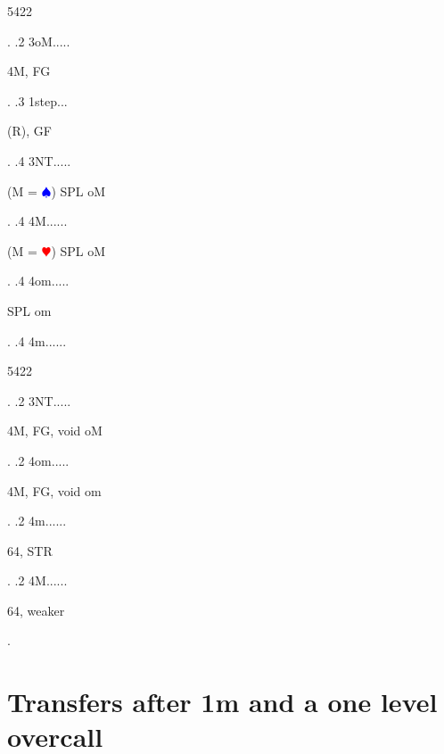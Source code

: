 \documentclass[a4paper]{article}
\newcommand{\BH}{\textcolor{Red}{$\varheartsuit${}}}
\newcommand{\BS}{\textcolor{Blue}{$\spadesuit${}}}
\begin{document}
{\begin{minipage}[t]{0.8\textwidth}
5422
\end{minipage}. 
 .2 3oM.....\begin{minipage}[t]{0.8\textwidth}
4M, FG
\end{minipage}. 
 .3 1step...\begin{minipage}[t]{0.8\textwidth}
(R), GF
\end{minipage}. 
 .4 3NT.....\begin{minipage}[t]{0.8\textwidth}
(M = \BS ) SPL oM
\end{minipage}. 
 .4 4M......\begin{minipage}[t]{0.8\textwidth}
(M = \BH ) SPL oM
\end{minipage}. 
 .4 4om.....\begin{minipage}[t]{0.8\textwidth}
SPL om
\end{minipage}. 
 .4 4m......\begin{minipage}[t]{0.8\textwidth}
5422
\end{minipage}. 
 .2 3NT.....\begin{minipage}[t]{0.8\textwidth}
4M, FG, void oM
\end{minipage}. 
 .2 4om.....\begin{minipage}[t]{0.8\textwidth}
4M, FG, void om
\end{minipage}. 
 .2 4m......\begin{minipage}[t]{0.8\textwidth}
64, STR
\end{minipage}. 
 .2 4M......\begin{minipage}[t]{0.8\textwidth}
64, weaker
\end{minipage}. 
}
\bigbreak
\section{Transfers after 1m and a one level overcall}
\end{document}

